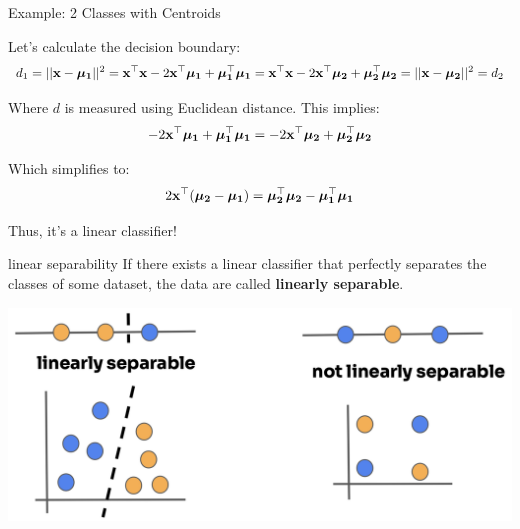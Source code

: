 \documentclass[11pt,compress,t,notes=noshow, xcolor=table]{beamer}
\begin{document}
\begin{vbframe}{Example: 2 Classes with Centroids}

Let's calculate the decision boundary:
$$
d_1 = ||\xv - \muk[1]||^2 = \xv^\top \xv - 2 \xv^\top \muk[1] + \muk[1]^\top \muk[1]
= \xv^\top \xv - 2 \xv^\top \muk[2] + \muk[2]^\top \muk[2] = ||\xv - \muk[2]||^2 = d_2
$$

Where $d$ is measured using Euclidean distance. This implies:
$$
-2 \xv^\top \muk[1] + \muk[1]^\top \muk[1]
= -2 \xv^\top \muk[2] + \muk[2]^\top \muk[2]
$$

Which simplifies to:
$$
2 \xv^\top (\muk[2] - \muk[1]) =\muk[2]^\top \muk[2] - \muk[1]^\top \muk[1]
$$

Thus, it's a linear classifier!

\end{vbframe}


\begin{vbframe}{linear separability}
If there exists a linear classifier that perfectly separates the classes of some dataset, the data are called \textbf{linearly separable}.

\vspace{1cm}

\begin{center}
\includegraphics{figure_man/linear_separability-1.png} 
\end{center}

\end{vbframe}
\end{document}
